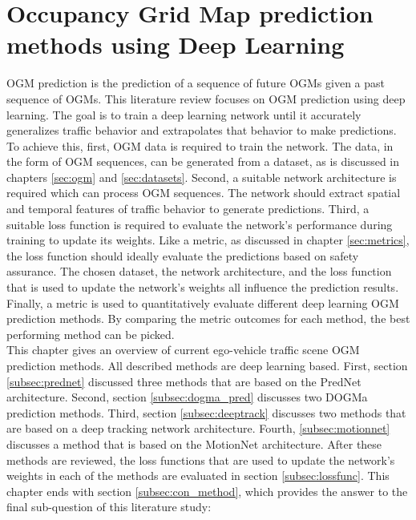 \section{Occupancy Grid Map prediction methods using Deep Learning} \label{sec:ogm_methods}
\gls{OGM} prediction is the prediction of a sequence of future \glspl{OGM} given a past sequence of \glspl{OGM}. This literature review focuses on \gls{OGM} prediction using deep learning. The goal is to train a deep learning network until it accurately generalizes traffic behavior and extrapolates that behavior to make predictions. To achieve this, first, \gls{OGM} data is required to train the network. The data, in the form of \gls{OGM} sequences, can be generated from a dataset, as is discussed in chapters \ref{sec:ogm} and \ref{sec:datasets}. Second, a suitable network architecture is required which can process \gls{OGM} sequences. The network should extract spatial and temporal features of traffic behavior to generate predictions. Third, a suitable loss function is required to evaluate the network's performance during training to update its weights. Like a metric, as discussed in chapter \ref{sec:metrics}, the loss function should ideally evaluate the predictions based on safety assurance. The chosen dataset, the network architecture, and the loss function that is used to update the network's weights all influence the prediction results. Finally, a metric is used to quantitatively evaluate different deep learning \gls{OGM} prediction methods. By comparing the metric outcomes for each method, the best performing method can be picked.  \\


This chapter gives an overview of current ego-vehicle traffic scene \gls{OGM} prediction methods. All described methods are deep learning based. First, section \ref{subsec:prednet} discussed three methods that are based on the PredNet \cite{lotter2016deep} architecture. Second, section \ref{subsec:dogma_pred} discusses two \gls{DOGMa} prediction methods. Third, section \ref{subsec:deeptrack} discusses two methods that are based on a deep tracking network architecture. Fourth, \ref{subsec:motionnet} discusses a method that is based on the MotionNet \cite{wu2020motionnet} architecture. After these methods are reviewed, the loss functions that are used to update the network's weights in each of the methods are evaluated in section \ref{subsec:lossfunc}. This chapter ends with section \ref{subsec:con_method}, which provides the answer to the final sub-question of this literature study: 


